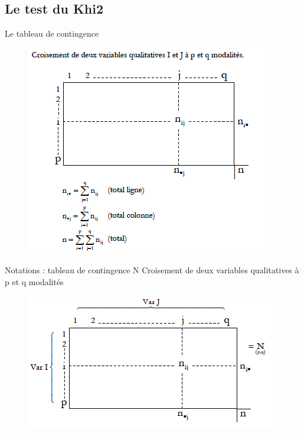 \documentclass[12pt]{beamer}
\begin{document}
\subsection{Le test du Khi2}




\begin{frame}{Le tableau de contingence}
\begin{figure}
\includegraphics[scale=0.6]{Exemple3.png}  
\end{figure}
\end{frame}

\begin{frame}{Notations : tableau de contingence  N}
Croisement de deux variables qualitatives à p et q modalités

\begin{figure}
\includegraphics[scale=0.7]{exemple8.png}  
\end{figure}
\end{frame}
\end{document}
